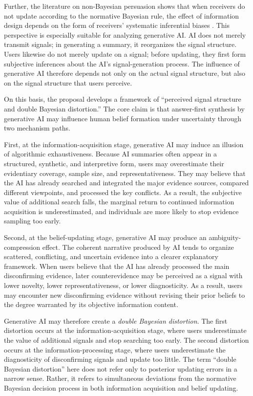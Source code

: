 Further, the literature on non-Bayesian persuasion shows that when receivers do not update according to the normative Bayesian rule, the effect of information design depends on the form of receivers' systematic inferential biases \citep{deClippelZhang2022}. This perspective is especially suitable for analyzing generative AI. AI does not merely transmit signals; in generating a summary, it reorganizes the signal structure. Users likewise do not merely update on a signal; before updating, they first form subjective inferences about the AI's signal-generation process. The influence of generative AI therefore depends not only on the actual signal structure, but also on the signal structure that users perceive.

On this basis, the proposal develops a framework of ``perceived signal structure and double Bayesian distortion.'' The core claim is that answer-first synthesis by generative AI may influence human belief formation under uncertainty through two mechanism paths.

First, at the information-acquisition stage, generative AI may induce an illusion of algorithmic exhaustiveness. Because AI summaries often appear in a structured, synthetic, and interpretive form, users may overestimate their evidentiary coverage, sample size, and representativeness. They may believe that the AI has already searched and integrated the major evidence sources, compared different viewpoints, and processed the key conflicts. As a result, the subjective value of additional search falls, the marginal return to continued information acquisition is underestimated, and individuals are more likely to stop evidence sampling too early.

Second, at the belief-updating stage, generative AI may produce an ambiguity-compression effect. The coherent narrative produced by AI tends to organize scattered, conflicting, and uncertain evidence into a clearer explanatory framework. When users believe that the AI has already processed the main disconfirming evidence, later counterevidence may be perceived as a signal with lower novelty, lower representativeness, or lower diagnosticity. As a result, users may encounter new disconfirming evidence without revising their prior beliefs to the degree warranted by its objective information content.

Generative AI may therefore create a \emph{double Bayesian distortion}. The first distortion occurs at the information-acquisition stage, where users underestimate the value of additional signals and stop searching too early. The second distortion occurs at the information-processing stage, where users underestimate the diagnosticity of disconfirming signals and update too little. The term ``double Bayesian distortion'' here does not refer only to posterior updating errors in a narrow sense. Rather, it refers to simultaneous deviations from the normative Bayesian decision process in both information acquisition and belief updating.

